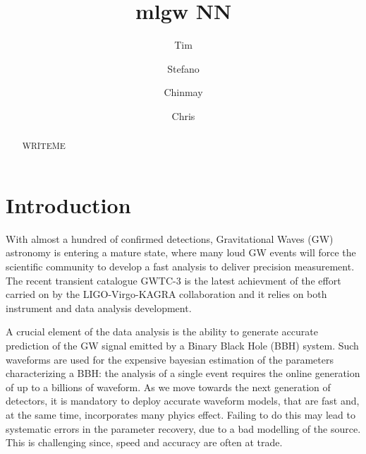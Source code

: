 \documentclass[twocolumn,showpacs,preprintnumbers,nofootinbib,prd,
superscriptaddress,10pt]{revtex4-1}
\begin{document}
\begin{abstract}

WRITEME

\end{abstract}
	
	\title{mlgw NN}
	\author{Tim }
	\author{Stefano }
	\author{Chinmay }
	\author{Chris }
	\maketitle

\section{Introduction}
\label{sec:intro}

With almost a hundred of confirmed detections, Gravitational Waves (GW) astronomy is entering a mature state, where many loud GW events will force the scientific community to develop a fast analysis to deliver precision measurement. The recent transient catalogue GWTC-3 \cite{} is the latest achievment of the effort carried on by the LIGO-Virgo-KAGRA collaboration and it relies on both instrument and data analysis development.

A crucial element of the data analysis is the ability to generate accurate prediction of the GW signal emitted by a Binary Black Hole (BBH) system. Such waveforms are used for the expensive bayesian estimation of the parameters characterizing a BBH: the analysis of a single event requires the online generation of up to a billions of waveform.
As we move towards the next generation of detectors, it is mandatory to deploy accurate waveform models, that are fast and, at the same time, incorporates many phyics effect. Failing to do this may lead to systematic errors in the parameter recovery, due to a bad modelling of the source.
This is challenging since, speed and accuracy are often at trade.
\end{document}
